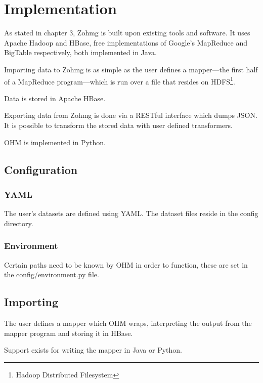 \documentclass[a4paper,10pt]{book}
\begin{document}
\chapter{Implementation}

As stated in chapter 3, Zohmg is built upon existing tools and software. It
uses Apache Hadoop and HBase, free implementations of Google's MapReduce
and BigTable respectively, both implemented in Java.

Importing data to Zohmg is as simple as the user defines a mapper---the
first half of a MapReduce program---which is run over a file that resides
on HDFS\footnote{Hadoop Distributed Filesystem}.

Data is stored in Apache HBase.

Exporting data from Zohmg is done via a RESTful interface which dumps JSON.
It is possible to transform the stored data with user defined transformers.

OHM is implemented in Python.



\section{Configuration}

\subsection{YAML}

The user's datasets are defined using YAML. The dataset files reside in the
config directory.


\subsection{Environment}

Certain paths need to be known by OHM in order to function, these are set
in the config/environment.py file.



\section{Importing}

The user defines a mapper which OHM wraps, interpreting the output from the
mapper program and storing it in HBase.

Support exists for writing the mapper in Java or Python.
\end{document}
